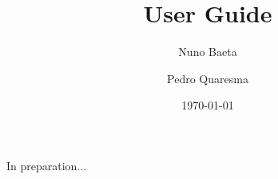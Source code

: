 \documentclass{book}
\title{\OGP \linebreak User Guide}
\author{Nuno Baeta \and Pedro Quaresma}
\date{\today}
\begin{document}
\maketitle

In preparation...
\end{document}

